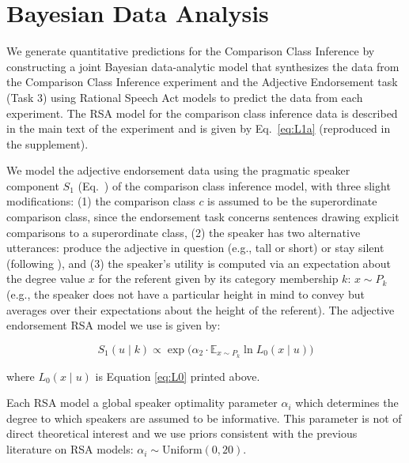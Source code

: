\documentclass[doc]{apa6}
\begin{document}

\section{Bayesian Data Analysis}

We generate quantitative predictions for the Comparison Class Inference by constructing a joint Bayesian data-analytic model that synthesizes the data from the Comparison Class Inference experiment and the Adjective Endorsement task (Task 3) using Rational Speech Act models to predict the data from each experiment. 
The RSA model for the comparison class inference data is described in the main text of the experiment and is given by Eq.~\ref{eq:L1a} (reproduced in the supplement). 

We model the adjective endorsement data using the pragmatic speaker component $S_1$ (Eq.~\label{eq:S1}) of the comparison class inference model, with three slight modifications: (1) the comparison class $c$ is assumed to be the superordinate comparison class, since the endorsement task concerns sentences drawing explicit comparisons to a superordinate class, (2) the speaker has two alternative utterances: produce the adjective in question (e.g., tall or short) or stay silent  (following ), and (3) the speaker's utility is computed via an expectation about the degree value $x$ for the referent given by its category membership $k$: $x\sim P_k$ (e.g., the speaker does not have a particular height in mind to convey but averages over their expectations about the height of the referent).
The adjective endorsement RSA model we use is given by: 

\begin{equation}
S_{1}(u \mid k) \propto \exp{(\alpha_2 \cdot {\mathbb E}_{x\sim P_k}} \ln{L_0(x \mid u)}) \label{eq:S1a}
\end{equation} 

\noindent where $L_0(x \mid u)$ is Equation \ref{eq:L0} printed above.

Each RSA model a global speaker optimality parameter $\alpha_{i}$ which determines the degree to which speakers are assumed to be informative.
This parameter is not of direct theoretical interest and we use priors consistent with the previous literature on RSA models: $\alpha_i \sim \text{Uniform}(0, 20)$.
\end{document}

